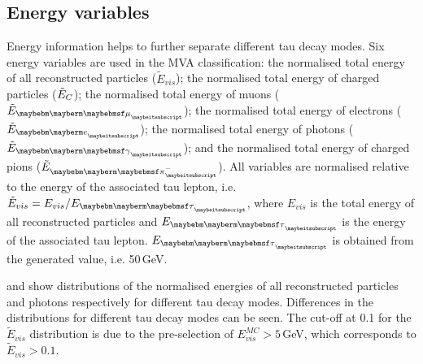 \subsection{Energy variables}

Energy information helps to further separate different tau decay modes. Six energy variables are used in the MVA classification: the normalised total energy of all reconstructed particles ($\tilde{E}_{vis}$); the normalised total energy of charged particles ($\tilde{E}_{C}$); the normalised total energy of muons ($\tilde{E}_{\Pmu}$); the normalised total energy of electrons ($\tilde{E}_{\Pe}$); the normalised total energy of photons ($\tilde{E}_{\Pgg}$); and the normalised total energy of charged pions ($\tilde{E}_{\Pgpm}$). All variables are normalised relative to the energy of the associated tau lepton, i.e. $\tilde{E}_{vis} = E_{vis} / E_{\Ptau}$, where $E_{vis} $ is the total energy of all reconstructed particles and $E_{\Ptau}$ is the energy of the associated tau lepton.  $E_{\Ptau}$ is obtained from the generated value, i.e. 50\,GeV.


 and  show distributions of the normalised energies of all reconstructed particles and photons respectively for different tau decay modes. Differences in the distributions for  different tau decay modes can be seen. The cut-off at 0.1 for the $\tilde{E}_{vis}$ distribution is due to the pre-selection of  $E_{vis}^{MC}>5$\,GeV, which corresponds to  $\tilde{E}_{vis}>0.1$.



